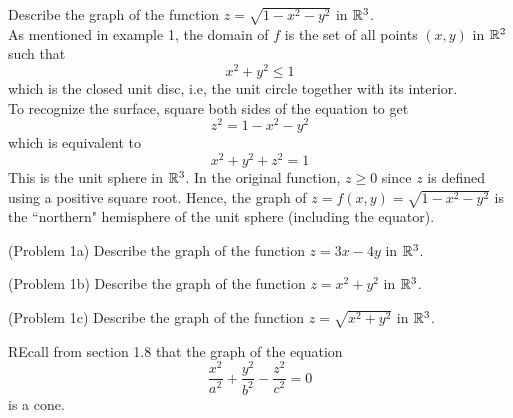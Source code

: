 \documentclass[handout]{ximera}
\begin{document}
\begin{example}[Example 2]
Describe the graph of the function $z = \sqrt{1 - x^2 - y^2}$ in $\mathbb R^3$.\\
As mentioned in example 1, the domain of $f$ is the set of all points $(x, y)$ in $\mathbb R^2$ such that
\[
x^2 + y^2 \leq 1
\]
which is the closed unit disc, i.e, the unit circle together with its interior.\\
To recognize the surface, square both sides of the equation to get
\[
z^2 = 1 - x^2 - y^2
\]
which is equivalent to
\[
x^2 + y^2 + z^2 = 1
\]
This is the unit sphere in $\mathbb R^3$. In the original function, $z\geq 0$ since $z$ is defined using a positive square root. 
Hence, the graph of $z = f(x, y) = \sqrt{1 - x^2 - y^2}$ is the ``northern" hemisphere of the unit sphere (including the equator).
\end{example}



\begin{problem}(Problem 1a)
Describe the graph of the function $z = 3x - 4y$ in $\mathbb R^3$.\\
\end{problem}

\begin{problem}(Problem 1b)
Describe the graph of the function $z = x^2 + y^2$ in $\mathbb R^3$.\\
\end{problem}

\begin{problem}(Problem 1c)
Describe the graph of the function $z = \sqrt{x^2 + y^2}$ in $\mathbb R^3$.\\
\begin{hint}
REcall from section 1.8 that the graph of the equation
\[
\frac{x^2}{a^2} + \frac{y^2}{b^2} - \frac{z^2}{c^2} = 0
\]
is a cone.
\end{hint}

\end{problem}
\end{document}
